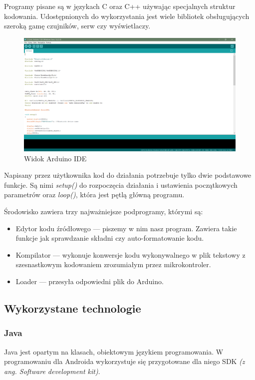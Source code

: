 \documentclass[a4paper,12pt, twoside]{article}
\begin{document}
    	Programy pisane są w językach C oraz C++ używając specjalnych struktur kodowania. Udostępnionych do wykorzystania  jest wiele bibliotek obsługujących szeroką gamę czujników, serw czy wyświetlaczy.
    	
    	\begin{figure}[H]
    			\includegraphics[width=1\textwidth]{images/rys3_arduino.png}
    			\caption{Widok Arduino IDE}
                \label{fig:arduinoide}
    	\end{figure}
    
    	Napisany przez użytkownika kod do działania potrzebuje tylko dwie podstawowe funkcje. Są nimi \textit{setup()} do rozpoczęcia działania i ustawienia początkowych parametrów oraz \textit{loop()}, która jest pętlą główną programu.
    	
    	Środowisko zawiera trzy najważniejsze podprogramy, którymi są:
    	\begin{itemize}
    	\item Edytor kodu źródłowego — piszemy w nim nasz program. Zawiera takie funkcje jak sprawdzanie składni czy auto-formatowanie kodu.
    	\item Kompilator — wykonuje konwersje kodu wykonywalnego w plik tekstowy z szesnastkowym kodowaniem zrozumiałym przez mikrokontroler.
    	\item Loader — przesyła odpowiedni plik do Arduino.
    	\end{itemize}
    	
    	\subsection{Wykorzystane technologie}
    	\subsubsection{Java}
    	Java jest opartym na klasach, obiektowym językiem programowania. W programowaniu dla Androida wykorzystuje się przygotowane dla niego SDK\textit{ (z ang. Software development kit)}\cite{sdk}.
    	
\end{document}
